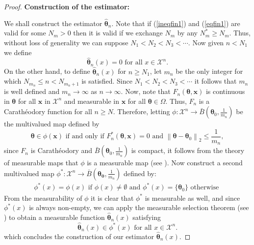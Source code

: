 \documentclass[10pt,a4paper,onecolumn]{article} %
\newcommand{\bs}{\boldsymbol}
\begin{document}
\begin{appendix}
\begin{proof}
\noindent \textbf{ Construction of the estimator:}
\vspace{0.3cm}

We shall construct the estimator $\bs{\hat{\theta}}_n$.
Note that if (\ref{ineqfin1}) and (\ref{eqfin1}) are valid for some $N_{m}>0$ then it is valid if we exchange $N_{m}$ by any $N^*_{m}\geq N_{m}$. Thus, without loss of generality we can suppose $N_1< N_2< N_3< \cdots$. Now given $n<N_1$ we define \begin{equation*}\bs{\hat{\theta}}_n(x)=0\mbox{ for all }x\in \mathcal{X}^n.
\end{equation*}
On the other hand, to define $\bs{\hat{\theta}}_n(x)$ for $n\geq N_1$, let $m_n$ be the only integer for which $N_{m_n}\leq n< N_{m_n+1}$ is satisfied. Since $N_1<N_2<N_3<\cdots$ it follows that $m_n$ is well defined and $m_n\to \infty$ as $n\to \infty$. Now,
note that $F_n(\bs{\theta},\bs{x})$ is continuous in $\bs{\theta}$ for all $\bs{x}$ in $\mathcal{X}^n$ and measurable in $\bs{x}$ for all $\bs{\theta}\in \Omega$. Thus, $F_n$ is a Carathéodory function for all $n\geq N$. Therefore, letting $\phi: \mathcal{X}^n\to \bar{B}\left(\bs{\theta}_0,\frac{1}{m_n}\right)$ be the multivalued map defined by
\begin{equation}\bs{\theta} \in \phi(\bs{x})\mbox{ if and only if } F^*_n(\bs{\theta},\bs{x}) = 0\mbox{ and }\left\|\bs{\theta} - \bs{\theta}_0\right\|_2\leq \frac{1}{m_n},
\end{equation}
since $F_n$ is Carathéodory and $\bar{B}\left(\bs{\theta}_0,\frac{1}{m_n}\right)$ is compact, it follows from the theory of measurable maps that $\phi$ is a measurable map (see \cite{2006-Charalambos}).
Now construct a second multivalued map $\phi^*:\mathcal{X}^n\to \bar{B}\left(\bs{\theta_0},\frac{1}{m_n}\right)$ defined by:
\begin{equation*}
\begin{aligned}
\phi^*(x) = \phi(x)\mbox{ if }\phi(x)\neq \emptyset\mbox{ and }
\phi^*(x) = \{\bs{\theta}_0\}\mbox{ otherwise }
\end{aligned}
\end{equation*}
From the measurability of $\phi$ it is clear that $\phi^*$ is measurable as well, and since $\phi^*(x)$ is always non-empty, we can apply the measurable selection theorem (see \cite{2006-Charalambos}) to obtain a measurable function $\bs{\hat{\theta}}_n(x)$ satisfying
\begin{equation*}
\bs{\hat{\theta}}_n(x) \in \phi^*(x) \mbox{ for all }x\in \mathcal{X}^n.
\end{equation*}
which concludes the construction of our estimator $\bs{\hat{\theta}}_n(x)$. 


\end{proof}
\end{appendix}
\end{document}

